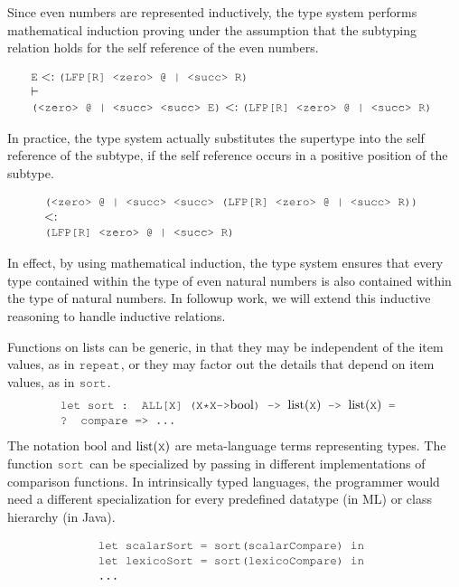 \documentclass[acmsmall]{acmart}
\theoremstyle{definition}
\begin{document}
\noindent
Since even numbers are represented inductively, the type system performs mathematical induction
proving under the assumption that the subtyping relation holds for the self reference of the even numbers. 

\[
  \begin{array}[t]{@{} l}
    \J{E} \subtypes \J{(LFP[R] <zero> @ | <succ> R)}
    \\
    \entails
    \\
    \J{(<zero> @ | <succ> <succ> E)} \subtypes \J{(LFP[R] <zero> @ | <succ> R)}
  \end{array}
\]

\noindent
In practice, the type system actually substitutes the supertype into
the self reference of the subtype, if the self reference occurs in a positive position of the subtype.

\[
  \begin{array}[t]{@{} l}
    \J{(<zero> @ | <succ> <succ> (LFP[R] <zero> @ | <succ> R))} 
    \\
    \subtypes 
    \\
    \J{(LFP[R] <zero> @ | <succ> R)}
  \end{array}
\]

\noindent
In effect, by using mathematical induction, the type system ensures that 
every type contained within the type of even natural numbers is also
contained within the type of natural numbers.
In followup work, we will extend this inductive reasoning to handle inductive relations. 

Functions on lists can be generic, in that they may be independent of the item values, as in $\J{repeat}$,
or they may factor out the details that depend on item values, as in $\J{sort}$. 
\[
  \begin{array}[t]{@{} l}
    \J{let sort : ALL[X] (X*X->} \text{bool} \J{) -> }\text{list}(\J{X}) \J{ -> } \text{list}(\J{X}) \J{ = }
    \\
    \J{? compare => ...}
  \end{array}
\]
\noindent
The notation $\text{bool}$ and $\text{list}(\J{X})$ are meta-language terms representing types.
The function $\J{sort}$ can be specialized by passing in different implementations of comparison functions.
In intrinsically typed languages, the programmer would need a different specialization for every predefined
datatype (in ML) or class hierarchy (in Java). 

\[
  \begin{array}[t]{@{} l}
    \J{let scalarSort = sort(scalarCompare) in}
    \\
    \J{let lexicoSort = sort(lexicoCompare) in} 
    \\
    \J{...} 
  \end{array}
\]
\end{document}
